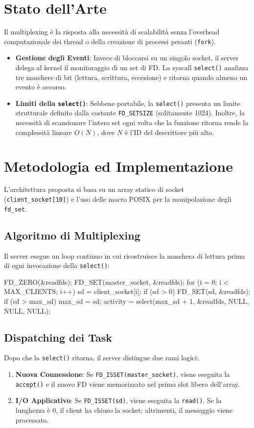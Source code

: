 \documentclass[a4paper,12pt]{article}
\begin{document}
\section{Stato dell'Arte}
Il multiplexing è la risposta alla necessità di scalabilità senza l'overhead computazionale dei thread o della creazione di processi pesanti (\texttt{fork}).
\begin{itemize}
    \item \textbf{Gestione degli Eventi}: Invece di bloccarsi su un singolo socket, il server delega al kernel il monitoraggio di un set di FD. La syscall \texttt{select()} analizza tre maschere di bit (lettura, scrittura, eccezione) e ritorna quando almeno un evento è occorso.
    \item \textbf{Limiti della \texttt{select()}}: Sebbene portabile, la \texttt{select()} presenta un limite strutturale definito dalla costante \texttt{FD_SETSIZE} (solitamente 1024). Inoltre, la necessità di scansionare l'intero set ogni volta che la funzione ritorna rende la complessità lineare $O(N)$, dove $N$ è l'ID del descrittore più alto.
\end{itemize}

\section{Metodologia ed Implementazione}
L'architettura proposta si basa su un array statico di socket (\texttt{client_socket[10]}) e l'uso delle macro POSIX per la manipolazione degli \texttt{fd_set}.

\subsection{Algoritmo di Multiplexing}
Il server esegue un loop continuo in cui ricostruisce la maschera di lettura prima di ogni invocazione della \texttt{select()}:
\begin{ccode}
FD_ZERO(&readfds);
FD_SET(master_socket, &readfds);
for (i = 0; i < MAX_CLIENTS; i++) {
    sd = client_socket[i];
    if (sd > 0) FD_SET(sd, &readfds);
    if (sd > max_sd) max_sd = sd;
}
activity = select(max_sd + 1, &readfds, NULL, NULL, NULL);
\end{ccode}

\subsection{Dispatching dei Task}
Dopo che la \texttt{select()} ritorna, il server distingue due rami logici:
\begin{enumerate}
    \item \textbf{Nuova Connessione}: Se \texttt{FD_ISSET(master_socket)}, viene eseguita la \texttt{accept()} e il nuovo FD viene memorizzato nel primo slot libero dell'array.
    \item \textbf{I/O Applicativo}: Se \texttt{FD_ISSET(sd)}, viene eseguita la \texttt{read()}. Se la lunghezza è 0, il client ha chiuso la socket; altrimenti, il messaggio viene processato.
\end{enumerate}
\end{document}
